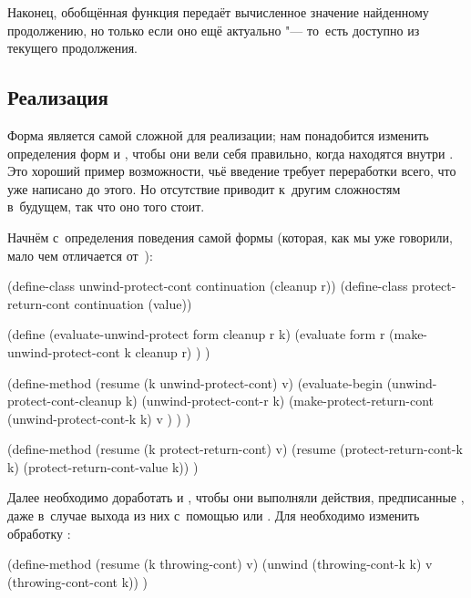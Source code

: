 Наконец, обобщённая функция  передаёт вычисленное значение найденному
продолжению, но только если оно ещё актуально "--- то~есть доступно из текущего
продолжения.


\subsection{\texorpdfstring%
{Реализация \protect{}}%
{Реализация unwind-protect}}%
\label{escape/implementation/ssect:unwind-protect}

Форма  является самой сложной для реализации; нам понадобится
изменить определения форм  и , чтобы они вели себя
правильно, когда находятся внутри . Это хороший пример
возможности, чьё введение требует переработки всего, что уже написано до этого.
Но отсутствие  приводит к~другим сложностям в~будущем, так
что оно того стоит.

Начнём с~определения поведения самой формы  (которая, как мы
уже говорили, мало чем отличается от~):

\begin{code:lisp}
(define-class unwind-protect-cont continuation (cleanup r))
(define-class protect-return-cont continuation (value))

(define (evaluate-unwind-protect form cleanup r k)
  (evaluate form r
            (make-unwind-protect-cont k cleanup r) ) )

(define-method (resume (k unwind-protect-cont) v)
  (evaluate-begin (unwind-protect-cont-cleanup k)
                  (unwind-protect-cont-r k)
                  (make-protect-return-cont
                   (unwind-protect-cont-k k) v ) ) )

(define-method (resume (k protect-return-cont) v)
  (resume (protect-return-cont-k k) (protect-return-cont-value k)) )
\end{code:lisp}

Далее необходимо доработать  и , чтобы они выполняли
действия, предписанные , даже в~случае выхода из них
с~помощью  или . Для  необходимо изменить
обработку :

\begin{code:lisp}
(define-method (resume (k throwing-cont) v)
  (unwind (throwing-cont-k k) v (throwing-cont-cont k)) )
\end{code:lisp}

